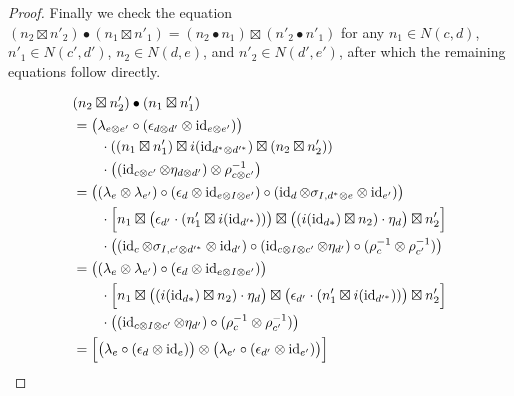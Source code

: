 \begin{proof}
	Finally we check the equation $(n_2\boxtimes n'_2)\bullet(n_1\boxtimes n'_1)=(n_2\bullet n_1)\boxtimes(n'_2\bullet n'_1)$ for any $n_1\in N(c,d)$, $n'_1\in N(c',d')$, $n_2\in N(d,e)$, and $n'_2\in N(d',e')$, after which the remaining equations follow directly.

	\begin{align*}
		&(n_2\boxtimes n'_2)\bullet(n_1\boxtimes n'_1) \\
		&= \bigl(\lambda_{e\otimes e'}\circ(\epsilon_{d\otimes d'}\otimes\id_{e\otimes e'})\bigr) \\
		&\qquad \cdot\left((n_1\boxtimes n'_1)\boxtimes i(\id_{d^*\otimes d'^{*}})\boxtimes(n_2\boxtimes n'_2)\right) \\
		&\qquad \cdot\left((\id_{c\otimes c'}\otimes\eta_{d\otimes d'})\otimes\rho_{c\otimes c'}^{-1}\right)\\
		&= \bigl((\lambda_e\otimes\lambda_{e'})\circ(\epsilon_d\otimes\id_{e\otimes I\otimes e'})\circ(\id_d\otimes\sigma_{I,d^*\otimes e}\otimes\id_{e'})\bigr) \\
		&\qquad \cdot\Bigl[n_1\boxtimes\bigl(\epsilon_{d'}\cdot(n'_1\boxtimes i(\id_{d'^{*}}))\bigr)\boxtimes\bigl((i(\id_{d*})\boxtimes n_2)\cdot\eta_d\bigr)\boxtimes n'_2\Bigr] \\
		&\qquad \cdot\bigl((\id_c\otimes\sigma_{I,c'\otimes d'^*}\otimes\id_{d'})\circ(\id_{c\otimes I\otimes c'}\otimes\eta_{d'})\circ(\rho_c^{-1}\otimes\rho_{c'}^{-1})\bigr) \\
		&= \bigl((\lambda_e\otimes\lambda_{e'})\circ(\epsilon_d\otimes\id_{e\otimes I\otimes e'})\bigr) \\
		&\qquad \cdot\Bigl[n_1\boxtimes\bigl((i(\id_{d*})\boxtimes n_2)\cdot\eta_d\bigr)\boxtimes\bigl(\epsilon_{d'}\cdot(n'_1\boxtimes i(\id_{d'^{*}}))\bigr)\boxtimes n'_2\Bigr] \\
		&\qquad \cdot\bigl((\id_{c\otimes I\otimes c'}\otimes\eta_{d'})\circ(\rho_c^{-1}\otimes\rho_{c'}^{-1})\bigr) \\
		&= \Bigl[\bigl(\lambda_e\circ(\epsilon_d\otimes\id_e)\bigr)\otimes\bigl(\lambda_{e'}\circ(\epsilon_{d'}\otimes\id_{e'})\bigr)\Bigr] \\

\end{align*}
\end{proof}
